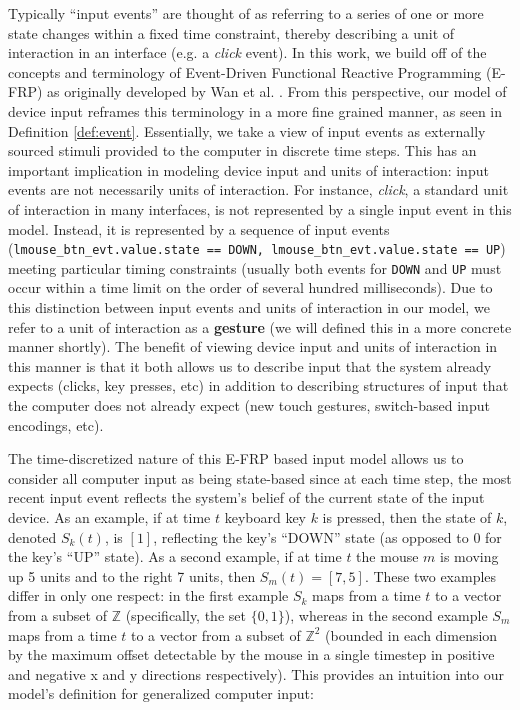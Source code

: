 \documentclass{article}
\newcommand{\Z}{\mathbb{Z}}
\begin{document}
Typically ``input events'' are thought of as referring to a series of one or more state changes within a fixed time constraint, thereby describing a unit of interaction in an interface (e.g. a \textit{click} event). In this work, we build off of the concepts and terminology of Event-Driven Functional Reactive Programming (E-FRP) as originally developed by Wan et al. \cite{wan2002event}. From this perspective, our model of device input reframes this terminology in a more fine grained manner, as seen in Definition \ref{def:event}. Essentially, we take a view of input events as externally sourced stimuli provided to the computer in discrete time steps. This has an important implication in modeling device input and units of interaction: input events are not necessarily units of interaction. For instance, \textit{click}, a standard unit of interaction in many interfaces, is not represented by a single input event in this model. Instead, it is represented by a sequence of input events (\texttt{lmouse\_btn\_evt.value.state == DOWN, lmouse\_btn\_evt.value.state == UP}) meeting particular timing constraints (usually both events for \texttt{DOWN} and \texttt{UP} must occur within a time limit on the order of several hundred milliseconds). Due to this distinction between input events and units of interaction in our model, we refer to a unit of interaction as a \textbf{gesture} (we will defined this in a more concrete manner shortly). The benefit of viewing device input and units of interaction in this manner is that it both allows us to describe input that the system already expects (clicks, key presses, etc) in addition to describing structures of input that the computer does not already expect (new touch gestures, switch-based input encodings, etc).

The time-discretized nature of this E-FRP based input model allows us to consider all computer input as being state-based since at each time step, the most recent input event reflects the system's belief of the current state of the input device. As an example, if at time $t$ keyboard key $k$ is pressed, then the state of $k$, denoted $S_k(t)$, is $[1]$, reflecting the key's ``DOWN'' state (as opposed to $0$ for the key's ``UP'' state). As a second example, if at time $t$ the mouse $m$ is moving up 5 units and to the right 7 units, then $S_m(t) = [7, 5]$. These two examples differ in only one respect: in the first example $S_k$ maps from a time $t$ to a vector from a subset of $\Z$ (specifically, the set $\{0, 1\}$), whereas in the second example $S_m$ maps from a time $t$ to a vector from a subset of $\Z^2$ (bounded in each dimension by the maximum offset detectable by the mouse in a single timestep in positive and negative x and y directions respectively). This provides an intuition into our model's definition for generalized computer input:
\end{document}
